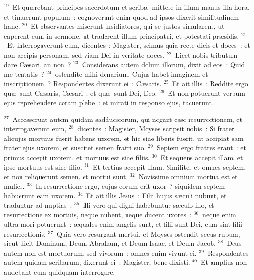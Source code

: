 ${}^{19}$~Et qu\ae rebant principes sacerdotum et scrib\ae\ mittere in illum manus illa hora, et timuerunt populum~: cognoverunt enim quod ad ipsos dixerit similitudinem hanc.
${}^{20}$~Et observantes miserunt insidiatores, qui se justos simularent, ut caperent eum in sermone, ut traderent illum principatui, et potestati pr\ae sidis.
${}^{21}$~Et interrogaverunt eum, dicentes~: Magister, scimus quia recte dicis et doces~: et non accipis personam, sed viam Dei in veritate doces.
${}^{22}$~Licet nobis tributum dare C\ae sari, an non~?
${}^{23}$~Considerans autem dolum illorum, dixit ad eos~: Quid me tentatis~?
${}^{24}$~ostendite mihi denarium. Cujus habet imaginem et inscriptionem~? Respondentes dixerunt ei~: C\ae saris.
${}^{25}$~Et ait illis~: Reddite ergo qu\ae\ sunt C\ae saris, C\ae sari~: et qu\ae\ sunt Dei, Deo.
${}^{26}$~Et non potuerunt verbum ejus reprehendere coram plebe~: et mirati in responso ejus, tacuerunt.


${}^{27}$~Accesserunt autem quidam sadduc\ae orum, qui negant esse resurrectionem, et interrogaverunt eum,
${}^{28}$~dicentes~: Magister, Moyses scripsit nobis~: Si frater alicujus mortuus fuerit habens uxorem, et hic sine liberis fuerit, ut accipiat eam frater ejus uxorem, et suscitet semen fratri suo.
${}^{29}$~Septem ergo fratres erant~: et primus accepit uxorem, et mortuus est sine filiis.
${}^{30}$~Et sequens accepit illam, et ipse mortuus est sine filio.
${}^{31}$~Et tertius accepit illam. Similiter et omnes septem, et non reliquerunt semen, et mortui sunt.
${}^{32}$~Novissime omnium mortua est et mulier.
${}^{33}$~In resurrectione ergo, cujus eorum erit uxor~? siquidem septem habuerunt eam uxorem.
${}^{34}$~Et ait illis Jesus~: Filii hujus s\ae culi nubunt, et traduntur ad nuptias~:
${}^{35}$~illi vero qui digni habebuntur s\ae culo illo, et resurrectione ex mortuis, neque nubent, neque ducent uxores~:
${}^{36}$~neque enim ultra mori potuerunt~: \ae quales enim angelis sunt, et filii sunt Dei, cum sint filii resurrectionis.
${}^{37}$~Quia vero resurgant mortui, et Moyses ostendit secus rubum, sicut dicit Dominum, Deum Abraham, et Deum Isaac, et Deum Jacob.
${}^{38}$~Deus autem non est mortuorum, sed vivorum~: omnes enim vivunt ei.
${}^{39}$~Respondentes autem quidam scribarum, dixerunt ei~: Magister, bene dixisti.
${}^{40}$~Et amplius non audebant eum quidquam interrogare.


